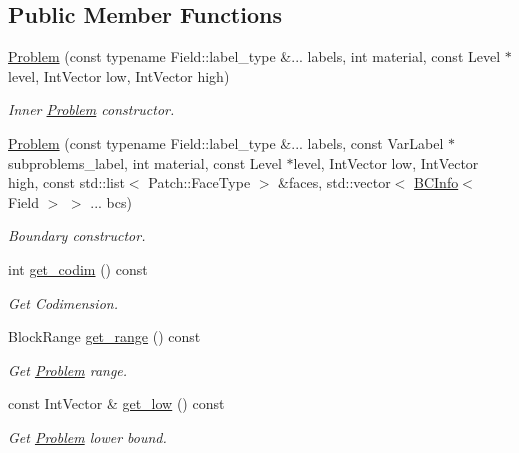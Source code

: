 \subsection*{Public Member Functions}
\begin{DoxyCompactItemize}
\item 
\hyperlink{classUintah_1_1PhaseField_1_1Problem_af12ef510fb87d6c905f7a29d173f88ba}{Problem} (const typename Field\+::label\+\_\+type \&... labels, int material, const Level $\ast$level, Int\+Vector low, Int\+Vector high)
\begin{DoxyCompactList}\small\item\em Inner \hyperlink{classUintah_1_1PhaseField_1_1Problem}{Problem} constructor. \end{DoxyCompactList}\item 
\hyperlink{classUintah_1_1PhaseField_1_1Problem_aa629dc3614e0da03bf75b5df4ddba69c}{Problem} (const typename Field\+::label\+\_\+type \&... labels, const Var\+Label $\ast$subproblems\+\_\+label, int material, const Level $\ast$level, Int\+Vector low, Int\+Vector high, const std\+::list$<$ Patch\+::\+Face\+Type $>$ \&faces, std\+::vector$<$ \hyperlink{structUintah_1_1PhaseField_1_1BCInfo}{B\+C\+Info}$<$ Field $>$ $>$ ... bcs)
\begin{DoxyCompactList}\small\item\em Boundary constructor. \end{DoxyCompactList}\item 
int \hyperlink{classUintah_1_1PhaseField_1_1Problem_ad1d8374a86011fd613e95249d74cf73f}{get\+\_\+codim} () const
\begin{DoxyCompactList}\small\item\em Get Codimension. \end{DoxyCompactList}\item 
Block\+Range \hyperlink{classUintah_1_1PhaseField_1_1Problem_a33f052fe4dd33891633a479b82e0bea0}{get\+\_\+range} () const
\begin{DoxyCompactList}\small\item\em Get \hyperlink{classUintah_1_1PhaseField_1_1Problem}{Problem} range. \end{DoxyCompactList}\item 
const Int\+Vector \& \hyperlink{classUintah_1_1PhaseField_1_1Problem_a2e415a1743c4eba4f4dc9c09c9c87422}{get\+\_\+low} () const
\begin{DoxyCompactList}\small\item\em Get \hyperlink{classUintah_1_1PhaseField_1_1Problem}{Problem} lower bound. \end{DoxyCompactList}\item 

\end{DoxyCompactItemize}
